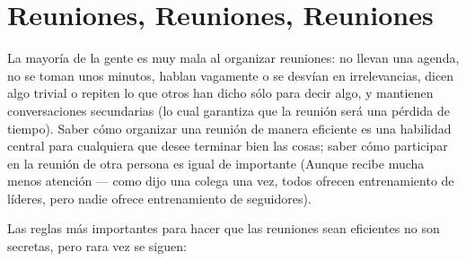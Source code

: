 \chapter{Reuniones, Reuniones, Reuniones}\label{s:meetings}

La mayoría de la gente es muy mala al organizar reuniones:
no llevan una agenda,
no se toman unos minutos,
hablan vagamente o se desvían en irrelevancias,
dicen algo trivial o repiten lo que otros han dicho
sólo para decir algo,
y mantienen conversaciones secundarias 
(lo cual garantiza que la reunión será una pérdida de tiempo).
Saber cómo organizar una reunión de manera eficiente
es una habilidad central para cualquiera que desee terminar bien las cosas;
saber cómo participar en la reunión de otra persona es igual de importante
(Aunque recibe mucha menos atención --- como dijo una colega una vez,
todos ofrecen entrenamiento de líderes,
pero nadie ofrece entrenamiento de seguidores).

Las reglas más importantes para hacer que las reuniones sean eficientes no son secretas,
pero rara vez se siguen:

